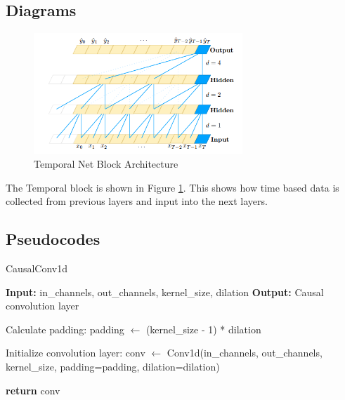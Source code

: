 \documentclass[10pt]{article}
\begin{document}
\subsection{Diagrams}
\begin{figure}[H]
    \centering
    \includegraphics[width=0.7\textwidth]{temporal.png}
    \caption{Temporal Net Block Architecture}
    \label{fig:temporal_arch}
\end{figure}
The Temporal block is shown in Figure \ref{fig:temporal_arch}. This shows how time based data is collected from previous layers and input into the next layers.

\subsection{Pseudocodes}
\begin{algorithm}[H]
  \caption{CausalConv1d}
  \begin{algorithmic}[1]
      \State \textbf{Input:} in\_channels, out\_channels, kernel\_size, dilation
      \State \textbf{Output:} Causal convolution layer

      \State Calculate padding: padding $\gets$ (kernel\_size - 1) * dilation

      \State Initialize convolution layer: conv $\gets$ Conv1d(in\_channels, out\_channels, kernel\_size, padding=padding, dilation=dilation)

      \State \textbf{return} conv
    \EndProcedure
  \end{algorithmic}
\end{algorithm}
\end{document}

